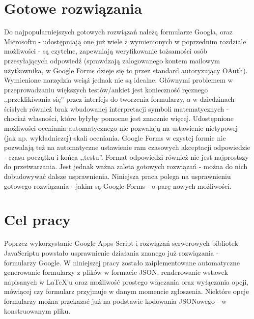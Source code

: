 \section{Gotowe rozwiązania}
Do najpopularniejszych gotowych rozwiązań należą formularze Googla, oraz Microsoftu - udostępniają one już wiele z  wymienionych w poprzednim rozdziale możliwości - są czytelne, zapewniają weryfikowanie  tożsamości osób przesyłających odpowiedź (sprawdzają zalogowanego kontem mailowym użytkownika, w Google Forms dzieje się  to przez standard autoryzujący OAuth).
\ind Wymienione narzędzia wciąż jednak nie są idealne. Głównymi problemem w przeprowadzaniu większych testów/ankiet jest konieczność ręcznego ,,przeklikiwania się'' przez interfejs do tworzenia formularzy, a w dziedzinach ścisłych również brak wbudowanej interpretacji symboli matematycznych - chociaż własności, które byłyby pomocne jest znacznie więcej. Udostępnione możliwości oceniania automatycznego nie pozwalają na ustawienie nietypowej (jak np. wykładniczej) skali oceniania. Google Forms w czystej formie nie pozwalają też na automatyczne ustawienie ram czasowych akceptacji odpowiedzie - czasu początku i końca ,,testu''. Format odpowiedzi również nie jest najprostszy do przetwarzania.
\ind Jest jednak ważna zaleta gotowych rozwiązań - można do nich dobudowywać dalsze usprawnienia. Niniejsza praca polega na usprawnieniu gotowego rozwiązania - jakim są Google Forms - o parę nowych możliwości.
\section{Cel pracy}
 Poprzez wykorzystanie Google Apps Script  i rozwiązań serwerowych bibliotek JavaScriptu powstało  usprawnienie działania znanego już rozwiązania - formularzy Google. W niniejszej pracy zostało zaiplementowane automatyczne generowanie formularzy z plików w formacie JSON, renderowanie wstawek napisanych w \LaTeX{}'u oraz możliwość prostego włączania oraz wyłączania opcji, mówiącej czy formularz przyjmuje w danym momencie zgłoszenia. Niektóre opcje formularzy można  przekazać już na podstawie kodowania JSONowego - w konstruowanym pliku.

